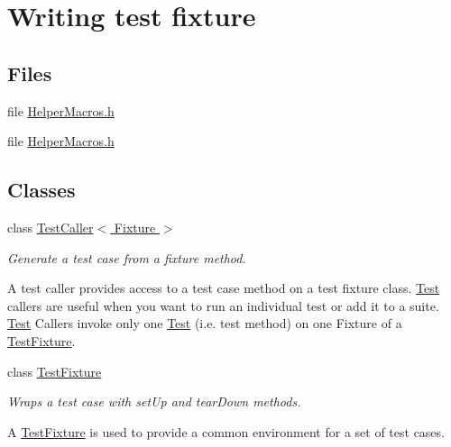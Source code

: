 \hypertarget{group___writing_test_fixture}{\section{Writing test fixture}
\label{group___writing_test_fixture}
}
\subsection*{Files}
\begin{DoxyCompactItemize}
\item 
file \hyperlink{assimp_2assimp-3_81_81_2contrib_2cppunit-1_812_81_2include_2cppunit_2extensions_2_helper_macros_8h}{Helper\+Macros.\+h}
\item 
file \hyperlink{bullet_2bullet-2_882-r2704_2_unit_tests_2cppunit_2include_2cppunit_2extensions_2_helper_macros_8h}{Helper\+Macros.\+h}
\end{DoxyCompactItemize}
\subsection*{Classes}
\begin{DoxyCompactItemize}
\item 
class \hyperlink{class_test_caller}{Test\+Caller$<$ Fixture $>$}
\begin{DoxyCompactList}\small\item\em Generate a test case from a fixture method.

A test caller provides access to a test case method on a test fixture class. \hyperlink{class_test}{Test} callers are useful when you want to run an individual test or add it to a suite. \hyperlink{class_test}{Test} Callers invoke only one \hyperlink{class_test}{Test} (i.\+e. test method) on one Fixture of a \hyperlink{class_test_fixture}{Test\+Fixture}. \end{DoxyCompactList}\item 
class \hyperlink{class_test_fixture}{Test\+Fixture}
\begin{DoxyCompactList}\small\item\em Wraps a test case with set\+Up and tear\+Down methods.

A \hyperlink{class_test_fixture}{Test\+Fixture} is used to provide a common environment for a set of test cases. \end{DoxyCompactList}\end{DoxyCompactItemize}
